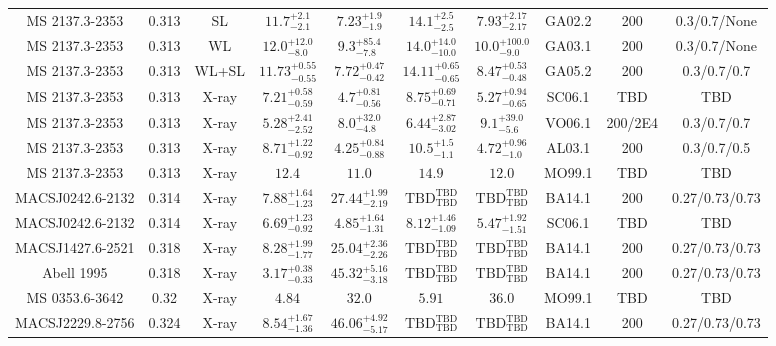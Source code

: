 \begin{table}
\begin{tabular}{cccccccccc}
MS 2137.3-2353 & 0.313 & SL & ${11.7}^{+2.1}_{-2.1}$ & ${7.23}^{+1.9}_{-1.9}$ & ${14.1}^{+2.5}_{-2.5}$ & ${7.93}^{+2.17}_{-2.17}$ & GA02.2 & 200 & 0.3/0.7/None \\
MS 2137.3-2353 & 0.313 & WL & ${12.0}^{+12.0}_{-8.0}$ & ${9.3}^{+85.4}_{-7.8}$ & ${14.0}^{+14.0}_{-10.0}$ & ${10.0}^{+100.0}_{-9.0}$ & GA03.1 & 200 & 0.3/0.7/None \\
MS 2137.3-2353 & 0.313 & WL+SL & ${11.73}^{+0.55}_{-0.55}$ & ${7.72}^{+0.47}_{-0.42}$ & ${14.11}^{+0.65}_{-0.65}$ & ${8.47}^{+0.53}_{-0.48}$ & GA05.2 & 200 & 0.3/0.7/0.7 \\
MS 2137.3-2353 & 0.313 & X-ray & ${7.21}^{+0.58}_{-0.59}$ & ${4.7}^{+0.81}_{-0.56}$ & ${8.75}^{+0.69}_{-0.71}$ & ${5.27}^{+0.94}_{-0.65}$ & SC06.1 & TBD & TBD \\
MS 2137.3-2353 & 0.313 & X-ray & ${5.28}^{+2.41}_{-2.52}$ & ${8.0}^{+32.0}_{-4.8}$ & ${6.44}^{+2.87}_{-3.02}$ & ${9.1}^{+39.0}_{-5.6}$ & VO06.1 & 200/2E4 & 0.3/0.7/0.7 \\
MS 2137.3-2353 & 0.313 & X-ray & ${8.71}^{+1.22}_{-0.92}$ & ${4.25}^{+0.84}_{-0.88}$ & ${10.5}^{+1.5}_{-1.1}$ & ${4.72}^{+0.96}_{-1.0}$ & AL03.1 & 200 & 0.3/0.7/0.5 \\
MS 2137.3-2353 & 0.313 & X-ray & ${12.4}^{}_{}$ & ${11.0}^{}_{}$ & ${14.9}^{}_{}$ & ${12.0}^{}_{}$ & MO99.1 & TBD & TBD \\
MACSJ0242.6-2132 & 0.314 & X-ray & ${7.88}^{+1.64}_{-1.23}$ & ${27.44}^{+1.99}_{-2.19}$ & ${\mathrm{TBD}}^{\mathrm{TBD}}_{\mathrm{TBD}}$ & ${\mathrm{TBD}}^{\mathrm{TBD}}_{\mathrm{TBD}}$ & BA14.1 & 200 & 0.27/0.73/0.73 \\
MACSJ0242.6-2132 & 0.314 & X-ray & ${6.69}^{+1.23}_{-0.92}$ & ${4.85}^{+1.64}_{-1.31}$ & ${8.12}^{+1.46}_{-1.09}$ & ${5.47}^{+1.92}_{-1.51}$ & SC06.1 & TBD & TBD \\
MACSJ1427.6-2521 & 0.318 & X-ray & ${8.28}^{+1.99}_{-1.77}$ & ${25.04}^{+2.36}_{-2.26}$ & ${\mathrm{TBD}}^{\mathrm{TBD}}_{\mathrm{TBD}}$ & ${\mathrm{TBD}}^{\mathrm{TBD}}_{\mathrm{TBD}}$ & BA14.1 & 200 & 0.27/0.73/0.73 \\
Abell 1995 & 0.318 & X-ray & ${3.17}^{+0.38}_{-0.33}$ & ${45.32}^{+5.16}_{-3.18}$ & ${\mathrm{TBD}}^{\mathrm{TBD}}_{\mathrm{TBD}}$ & ${\mathrm{TBD}}^{\mathrm{TBD}}_{\mathrm{TBD}}$ & BA14.1 & 200 & 0.27/0.73/0.73 \\
MS 0353.6-3642 & 0.32 & X-ray & ${4.84}^{}_{}$ & ${32.0}^{}_{}$ & ${5.91}^{}_{}$ & ${36.0}^{}_{}$ & MO99.1 & TBD & TBD \\
MACSJ2229.8-2756 & 0.324 & X-ray & ${8.54}^{+1.67}_{-1.36}$ & ${46.06}^{+4.92}_{-5.17}$ & ${\mathrm{TBD}}^{\mathrm{TBD}}_{\mathrm{TBD}}$ & ${\mathrm{TBD}}^{\mathrm{TBD}}_{\mathrm{TBD}}$ & BA14.1 & 200 & 0.27/0.73/0.73 \\

\end{tabular}
\end{table}
